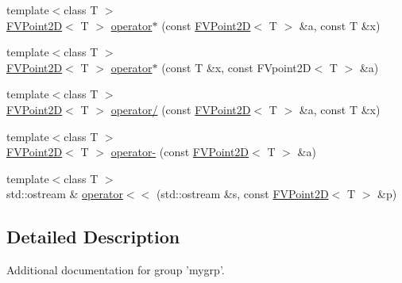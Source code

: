 \begin{DoxyCompactItemize}
\item 
{\footnotesize template$<$class T $>$ }\\\hyperlink{classFVPoint2D}{FVPoint2D}$<$ T $>$ \hyperlink{group__mygrp_ga9182bd9a6593151a580c126b2b9a95a7}{operator$\ast$} (const \hyperlink{classFVPoint2D}{FVPoint2D}$<$ T $>$ \&a, const T \&x)
\item 
{\footnotesize template$<$class T $>$ }\\\hyperlink{classFVPoint2D}{FVPoint2D}$<$ T $>$ \hyperlink{group__mygrp_ga2c00ee27a6efec77777d871f17c4a8ad}{operator$\ast$} (const T \&x, const FVpoint2D$<$ T $>$ \&a)
\item 
{\footnotesize template$<$class T $>$ }\\\hyperlink{classFVPoint2D}{FVPoint2D}$<$ T $>$ \hyperlink{group__mygrp_ga101d709be4cbb8fbf4d3d6dea90b2e89}{operator/} (const \hyperlink{classFVPoint2D}{FVPoint2D}$<$ T $>$ \&a, const T \&x)
\item 
{\footnotesize template$<$class T $>$ }\\\hyperlink{classFVPoint2D}{FVPoint2D}$<$ T $>$ \hyperlink{group__mygrp_gaf2e46d2e39647630b0c1cc146298ef33}{operator-\/} (const \hyperlink{classFVPoint2D}{FVPoint2D}$<$ T $>$ \&a)
\item 
{\footnotesize template$<$class T $>$ }\\std::ostream \& \hyperlink{group__mygrp_ga2c42a06efa3c35dd1fc72c25430a1b1c}{operator$<$$<$} (std::ostream \&s, const \hyperlink{classFVPoint2D}{FVPoint2D}$<$ T $>$ \&p)
\end{DoxyCompactItemize}


\subsection{Detailed Description}
Additional documentation for group 'mygrp'. 

